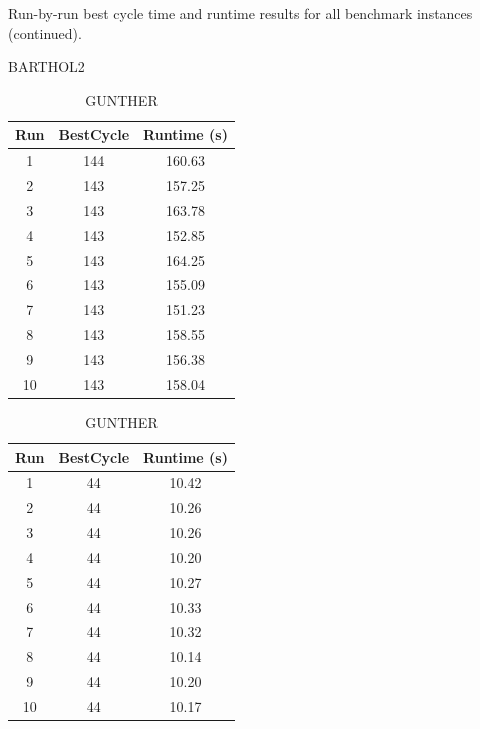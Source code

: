 \documentclass[12pt,a4paper]{article}
\begin{document}
\begin{table}[t]
\ContinuedFloat
\centering
\caption{Run-by-run best cycle time and runtime results for all benchmark instances (continued).}
\footnotesize

\begin{subtable}{0.48\textwidth}
\centering
\caption{BARTHOL2}
\begin{tabular}{ccc}
\toprule
Run & BestCycle & Runtime (s) \\
\midrule
1  & 144 & 160.63 \\
2  & 143 & 157.25 \\
3  & 143 & 163.78 \\
4  & 143 & 152.85 \\
5  & 143 & 164.25 \\
6  & 143 & 155.09 \\
7  & 143 & 151.23 \\
8  & 143 & 158.55 \\
9  & 143 & 156.38 \\
10 & 143 & 158.04 \\
\bottomrule
\end{tabular}
\end{subtable}
\hfill
\begin{subtable}{0.48\textwidth}
\centering
\caption{GUNTHER}
\begin{tabular}{ccc}
\toprule
Run & BestCycle & Runtime (s) \\
\midrule
1  & 44 & 10.42 \\
2  & 44 & 10.26 \\
3  & 44 & 10.26 \\
4  & 44 & 10.20 \\
5  & 44 & 10.27 \\
6  & 44 & 10.33 \\
7  & 44 & 10.32 \\
8  & 44 & 10.14 \\
9  & 44 & 10.20 \\
10 & 44 & 10.17 \\
\bottomrule
\end{tabular}
\end{subtable}

\end{table}



\clearpage
\end{document}
